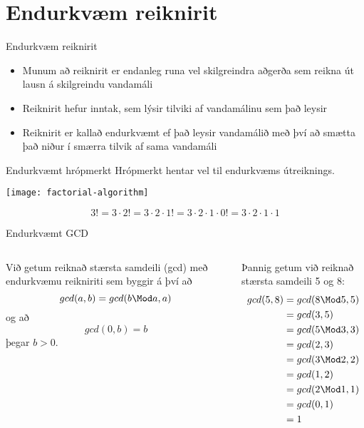 \documentclass[handout]{beamer}
\begin{document}
\section{Endurkvæm reiknirit}

\begin{frame}{Endurkvæm reiknirit}
\begin{itemize}
 \item Munum að reiknirit er endanleg runa vel skilgreindra aðgerða sem reikna út lausn á skilgreindu vandamáli
 \item Reiknirit hefur inntak, sem lýsir tilviki af vandamálinu sem það leysir
 \item Reiknirit er kallað endurkvæmt ef það leysir vandamálið með því að smætta það niður í smærra tilvik af sama vandamáli
\end{itemize}
\end{frame}

\begin{frame}{Endurkvæmt hrópmerkt}
Hrópmerkt hentar vel til endurkvæms útreiknings.
\begin{center}
\texttt{[image: factorial-algorithm]}
\end{center}
\[
3! = 3\cdot 2! = 3 \cdot 2 \cdot 1! = 3 \cdot 2 \cdot 1 \cdot 0! = 3 \cdot 2 \cdot 1 \cdot 1
\]
\end{frame}

\begin{frame}{Endurkvæmt GCD}
\begin{columns}
Við getum reiknað stærsta samdeili (gcd) með endurkvæmu reikniriti sem byggir á því að 
\[
 gcd(a,b) = gcd(b \Mod a, a)
\]
og að 
\[
 gcd(0,b) = b
\]
þegar $b > 0$.

\vspace{0.5cm}
Þannig getum við reiknað stærsta samdeili 5 og 8:
\begin{align*}
gcd(5,8) &= gcd(8 \Mod 5, 5)\\
&= gcd(3,5)\\
&= gcd(5 \Mod 3, 3)\\
&= gcd(2,3)\\
&= gcd(3 \Mod 2, 2)\\
&= gcd(1,2)\\
&= gcd(2 \Mod 1, 1)\\
&= gcd(0,1)\\
&= 1
\end{align*}

\end{columns}
\end{frame}
\end{document}
